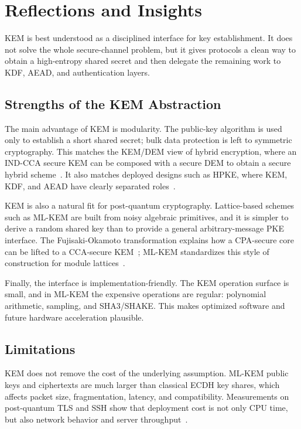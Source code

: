 \chapter{Reflections and Insights}

KEM is best understood as a disciplined interface for key establishment. It
does not solve the whole secure-channel problem, but it gives protocols a clean
way to obtain a high-entropy shared secret and then delegate the remaining work
to KDF, AEAD, and authentication layers.

\section{Strengths of the KEM Abstraction}

The main advantage of KEM is modularity. The public-key algorithm is used only
to establish a short shared secret; bulk data protection is left to symmetric
cryptography. This matches the KEM/DEM view of hybrid encryption, where an
IND-CCA secure KEM can be composed with a secure DEM to obtain a secure hybrid
scheme~\cite{shoup2001proposal}. It also matches deployed designs such as HPKE,
where KEM, KDF, and AEAD have clearly separated roles~\cite{rfc9180}.

KEM is also a natural fit for post-quantum cryptography. Lattice-based schemes
such as ML-KEM are built from noisy algebraic primitives, and it is simpler to
derive a random shared key than to provide a general arbitrary-message PKE
interface. The Fujisaki-Okamoto transformation explains how a CPA-secure core
can be lifted to a CCA-secure KEM~\cite{fujisaki1999secure,hofheinz2017modular};
ML-KEM standardizes this style of construction for module lattices~\cite{bos2018crystals,nist2024fips203}.

Finally, the interface is implementation-friendly. The KEM operation surface is
small, and in ML-KEM the expensive operations are regular: polynomial
arithmetic, sampling, and SHA3/SHAKE. This makes optimized software
and future hardware acceleration plausible.

\section{Limitations}

KEM does not remove the cost of the underlying assumption. ML-KEM public keys
and ciphertexts are much larger than classical ECDH key shares, which affects
packet size, fragmentation, latency, and compatibility. Measurements on
post-quantum TLS and SSH show that deployment cost is not only CPU time, but
also network behavior and server throughput~\cite{sikeridis2020assessing}.

